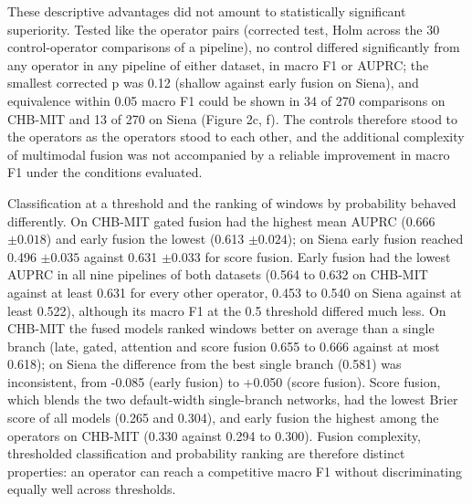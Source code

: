 \documentclass[11pt,a4paper]{article}
\begin{document}
These descriptive advantages did not amount to statistically significant superiority.
Tested like the operator pairs (corrected test, Holm across the 30 control-operator
comparisons of a pipeline), no control differed significantly
from any operator in any pipeline of either dataset, in macro F1 or AUPRC; the smallest
corrected p was 0.12 (shallow against early fusion on Siena), and equivalence within
0.05 macro F1 could be shown in 34 of 270 comparisons on CHB-MIT and 13 of 270 on Siena
(Figure 2c, f). The controls therefore stood to the operators as the operators stood to
each other, and the additional complexity of multimodal fusion was not accompanied by a
reliable improvement in macro F1 under the conditions evaluated.

Classification at a threshold and the ranking of windows by probability behaved
differently. On CHB-MIT gated fusion had the highest mean AUPRC (0.666 \(\pm 0.018\)) and early
fusion the lowest (0.613 \(\pm 0.024\)); on Siena early fusion reached 0.496 \(\pm 0.035\) against
0.631 \(\pm 0.033\) for score fusion. Early fusion had the lowest AUPRC in all nine pipelines
of both datasets (0.564 to 0.632 on CHB-MIT against at least 0.631 for every other
operator, 0.453 to 0.540 on Siena against at least 0.522), although its macro F1 at the
0.5 threshold differed much less. On CHB-MIT the fused models ranked windows better on
average than a single branch (late, gated, attention and score fusion 0.655 to 0.666
against at most 0.618); on Siena the difference from the best single branch (0.581) was
inconsistent, from -0.085 (early fusion) to +0.050 (score fusion). Score fusion, which
blends the two default-width single-branch networks, had the lowest Brier score of all
models (0.265 and 0.304), and early fusion the highest among the operators on CHB-MIT
(0.330 against 0.294 to 0.300). Fusion complexity, thresholded classification and
probability ranking are therefore distinct properties: an operator can reach a
competitive macro F1 without discriminating equally well across thresholds.

\begingroup\small
\end{document}
